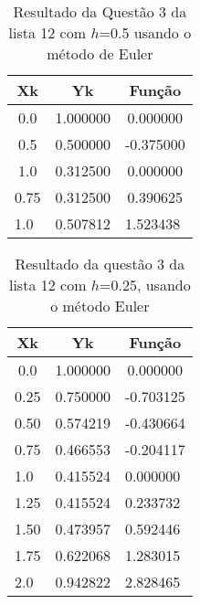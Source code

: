 \documentclass[12pt]{article}
\begin{document}
\begin{table}[!h]
    \centering
\begin{tabular}{c|c|c}
\textbf{Xk}              & \textbf{Yk}                   & \textbf{Função}              \\ \hline
0.0                      & 1.000000                      & 0.000000                     \\
0.5                      & 0.500000                      & -0.375000                    \\
1.0                      & 0.312500                      & 0.000000                     \\
0.75                     & 0.312500                      & 0.390625                     \\
\multicolumn{1}{l|}{1.0} & \multicolumn{1}{l|}{0.507812} & \multicolumn{1}{l}{1.523438} \\ \hline
\end{tabular}
    \caption{Resultado da Questão 3 da lista 12 com $h$=0.5 usando o método de Euler}
\end{table}



\begin{table}[!h]
    \centering
\begin{tabular}{l|l|l}
\multicolumn{1}{c|}{\textbf{Xk}} & \multicolumn{1}{c|}{\textbf{Yk}} & \multicolumn{1}{c}{\textbf{Função}} \\ \hline
\multicolumn{1}{c|}{0.0}         & \multicolumn{1}{c|}{1.000000}    & \multicolumn{1}{c}{0.000000}        \\
\multicolumn{1}{c|}{0.25}        & \multicolumn{1}{c|}{0.750000}    & \multicolumn{1}{c}{-0.703125}       \\
\multicolumn{1}{c|}{0.50}        & \multicolumn{1}{c|}{0.574219}    & \multicolumn{1}{c}{-0.430664}       \\
\multicolumn{1}{c|}{0.75}        & \multicolumn{1}{c|}{0.466553}    & \multicolumn{1}{c}{-0.204117}       \\
1.0                              & 0.415524                         & 0.000000                            \\
1.25                             & 0.415524                         & 0.233732                            \\
1.50                             & 0.473957                         & 0.592446                            \\
1.75                             & 0.622068                         & 1.283015                            \\
2.0                              & 0.942822                         & 2.828465                            \\ \hline
\end{tabular}
    \caption{Resultado da questão 3 da lista 12 com $h$=0.25, usando o método Euler}
\end{table}
\end{document}
